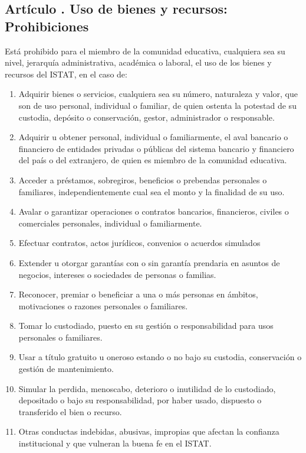 \subsection{Artículo . Uso de bienes y recursos: Prohibiciones}
\addtocounter{ns}{1}
Está prohibido para el miembro de la comunidad educativa, cualquiera sea su nivel, jerarquía administrativa, académica o laboral, el uso de los bienes y recursos del ISTAT, en el caso de: 
\begin{enumerate}
\item Adquirir bienes o servicios, cualquiera sea su número, naturaleza y valor, que son de uso personal, individual o familiar, de quien ostenta la potestad de su custodia, depósito o conservación, gestor, administrador o responsable. 
\item Adquirir u obtener personal, individual o familiarmente, el aval bancario o financiero de entidades privadas o públicas del sistema bancario y financiero del país o del extranjero, de quien es miembro de la comunidad educativa.
\item Acceder a préstamos, sobregiros, beneficios o prebendas personales o familiares, independientemente cual sea el monto y la finalidad de su uso. 
\item Avalar o garantizar operaciones o contratos bancarios, financieros, civiles o comerciales personales, individual o familiarmente.  
\item Efectuar contratos, actos jurídicos, convenios o acuerdos simulados  
\item Extender u otorgar garantías con o sin garantía prendaria en asuntos de negocios, intereses o sociedades de personas o familias. 
\item Reconocer, premiar o beneficiar a una o más personas en ámbitos, motivaciones o razones personales o familiares. 
\item Tomar lo custodiado, puesto en su gestión o responsabilidad para usos personales o familiares. 
\item Usar a título gratuito u oneroso estando o no bajo su custodia, conservación o gestión de mantenimiento.  
\item Simular la perdida, menoscabo, deterioro o inutilidad de lo custodiado, depositado o bajo su responsabilidad, por haber usado, dispuesto o transferido el bien o recurso. 
\item Otras conductas indebidas, abusivas, impropias que afectan la confianza institucional y que vulneran la buena fe en el ISTAT.
\end{enumerate}

